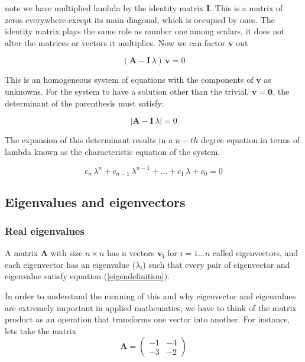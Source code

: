 \documentclass[12pt]{article}
\begin{document}
note we have multiplied lambda by the identity matrix $\mathbf{I}$. This is a matrix of zeros everywhere except its main diagonal, which is occupied by ones. The identity matrix plays the same role as number one among scalars, it does not alter the matrices or vectors it multiplies. Now we can factor $\mathbf{v}$ out 

\begin{equation}
	\label{solve4eigenvec}
	\left( \mathbf{A}   - \mathbf{I} \, \lambda     \right) \, \mathbf{v} =  0  
\end{equation}

This is an homogeneous system of equations with the components of $\mathbf{v}$ as unknowns. For the system to have a solution other than the trivial, $\mathbf{v}=\mathbf{0}$, the determinant of the parenthesis must satisfy:

\begin{equation}
	\label{solve4eigenval}
	\left| \mathbf{A}   - \mathbf{I} \, \lambda     \right|  =  0  
\end{equation}

The expansion of this determinant results in a $n-th$ degree equation in terms of lambda known as the characteristic equation of the system.

\begin{equation}
c_n \, \lambda^n +c_{n-1} \, \lambda^{n-1}  + \dots  + c_1 \, \lambda + c_0 = 0 \nonumber
\end{equation}

\subsection{Eigenvalues and eigenvectors} 

\subsubsection{Real eigenvalues}
A matrix $\mathbf{A}$ with size $n \times n$ has n vectors $\mathbf{v_i}$ for $i = 1 \dots n$ called eigenvectors, and each eigenvector has an eigenvalue ($\lambda_i$) such that every pair of eigenvector and eigenvalue satisfy equation (\ref{eigendefinition}).
	
In order to understand the meaning of this and why eigenvector and eigenvalues are extremely important in applied mathematics, we have to think of the matrix product as an operation that transforms one vector into another. For instance, lets take the matrix
\begin{equation}
	\mathbf{A}  = \begin{pmatrix} -1 & -4\\ -3 & -2\end{pmatrix} \nonumber
\end{equation}
\end{document}
